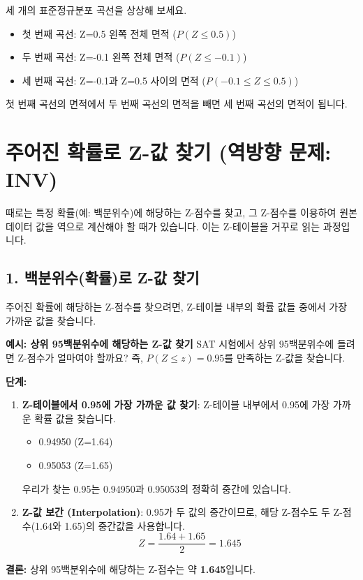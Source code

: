 \documentclass[11pt,a4paper]{book}
\providecommand{\newsection}{\section}
\theoremstyle{definition}
\begin{document}
\begin{examplebox}
\begin{tcolorbox}[title={\textbf{시각적 이해}, colback=lightblue!50!white, colframe=darkblue}]
세 개의 표준정규분포 곡선을 상상해 보세요.
\begin{itemize}
    \item 첫 번째 곡선: Z=0.5 왼쪽 전체 면적 ($P(Z \le 0.5)$)
    \item 두 번째 곡선: Z=-0.1 왼쪽 전체 면적 ($P(Z \le -0.1)$)
    \item 세 번째 곡선: Z=-0.1과 Z=0.5 사이의 면적 ($P(-0.1 \le Z \le 0.5)$)
\end{itemize}
첫 번째 곡선의 면적에서 두 번째 곡선의 면적을 빼면 세 번째 곡선의 면적이 됩니다.
\end{tcolorbox}
\end{examplebox}

\newsection*{주어진 확률로 Z-값 찾기 (역방향 문제: INV)}
때로는 특정 확률(예: 백분위수)에 해당하는 Z-점수를 찾고, 그 Z-점수를 이용하여 원본 데이터 값을 역으로 계산해야 할 때가 있습니다. 이는 Z-테이블을 거꾸로 읽는 과정입니다.

\subsection{1. 백분위수(확률)로 Z-값 찾기}
주어진 확률에 해당하는 Z-점수를 찾으려면, Z-테이블 내부의 확률 값들 중에서 가장 가까운 값을 찾습니다.

\begin{examplebox}
\textbf{예시: 상위 95백분위수에 해당하는 Z-값 찾기}
SAT 시험에서 상위 95백분위수에 들려면 Z-점수가 얼마여야 할까요? 즉, $P(Z \le z) = 0.95$를 만족하는 Z-값을 찾습니다.

\textbf{단계:}
\begin{enumerate}
    \item \textbf{Z-테이블에서 0.95에 가장 가까운 값 찾기}: Z-테이블 내부에서 0.95에 가장 가까운 확률 값을 찾습니다.
    \begin{itemize}
        \item 0.94950 (Z=1.64)
        \item 0.95053 (Z=1.65)
    \end{itemize}
    우리가 찾는 0.95는 0.94950과 0.95053의 정확히 중간에 있습니다.
    \item \textbf{Z-값 보간 (Interpolation)}: 0.95가 두 값의 중간이므로, 해당 Z-점수도 두 Z-점수(1.64와 1.65)의 중간값을 사용합니다.
    \[ Z = \frac{1.64 + 1.65}{2} = 1.645 \]
\end{enumerate}
\textbf{결론:} 상위 95백분위수에 해당하는 Z-점수는 약 \textbf{1.645}입니다.
\end{examplebox}
\end{document}
